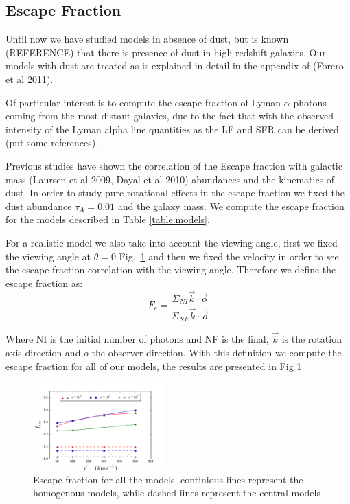 \documentclass[usenatbib]{mn2e}
\begin{document}
\subsection{Escape Fraction}
\label{sec:EF}

Until now we have studied models in absence of dust, but is known (REFERENCE) 
that there is presence of dust in high redshift galaxies. Our models with 
dust are treated as is explained in detail in  the appendix of (Forero et al 2011).  

Of particular interest is to compute the escape fraction of Lyman $\alpha$ 
photons coming from the most distant galaxies, due to the fact that with the 
observed intensity of the Lyman alpha line quantities as the LF and SFR can 
be derived (put some references).

Previous studies have shown the correlation of the Escape fraction with galactic 
mass (Laursen et al 2009, Dayal et al 2010) abundances and the kinematics of dust. 
In order to study pure rotational effects in the escape fraction we fixed the dust 
abundance $\tau_{A}=0.01$ and the galaxy mass. We compute the escape fraction for 
the models described in Table \ref{table:models}.

For a realistic model we also take into account the viewing angle, first we fixed 
the viewing angle at $\theta = 0$  Fig.~\ref{figure:efvsv} and then we fixed the 
velocity in order to see the escape fraction correlation with the viewing angle. 
Therefore we define the escape fraction as:\\ 

\begin{equation}
F_{e}=\dfrac{\Sigma_{NI} \vec{k}\cdot \vec{o}}{\Sigma_{NF}\vec{k}\cdot \vec{o}}
\end{equation}

Where NI is the initial number of photons and NF is the final,
$\vec{k}$ is the rotation axis direction and ${o}$ the observer
direction. With this definition we compute the escape fraction for all
of our models, the results are presented in Fig \ref{figure:efvsv}\\  
 
\begin{figure}
  \includegraphics[width=0.45\textwidth]{EscapeFraction.png}
   \caption{Escape fraction for all the models. continious lines represent the homogenous models, while dashed lines represent the central models}\label{figure:efvsv}
\end{figure}
\end{document}
